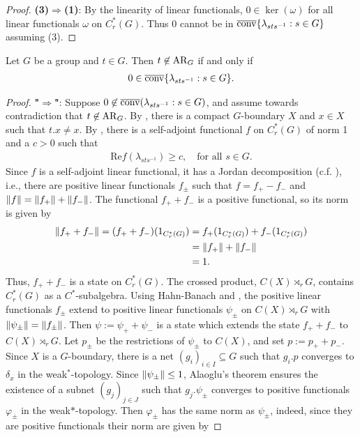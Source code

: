 \begin{lemma}
\begin{proof}
\noindent \textbf{(3)$\Rightarrow$(1)}: By the linearity of linear functionals, $0 \in \ker(\omega)$ for all linear functionals $\omega$ on $C_r^*(G)$. Thus $0$ cannot be in $\overline{\operatorname{conv}}\{ \lambda_{sts^{-1}} : s \in G \}$ assuming (3).
\end{proof}
\end{lemma}


\begin{theorem}\label{trivial AR_g 0 in conv}
Let $G$ be a group and $t \in G$. Then $t \not\in \operatorname{AR}_G$ if and only if 
\begin{align*}
0 \in \overline{\operatorname{conv}}\{\lambda_{sts^{-1}} : s \in G\}.
\end{align*}
\begin{proof}
\textbf{"$\Rightarrow$"}: Suppose $0 \not\in \overline{\operatorname{conv}}(\lambda_{sts^{-1}} : s \in G)$, and assume towards contradiction that $t \not \in \operatorname{AR}_G$. By , there is a compact $G$-boundary $X$ and $x \in X$ such that $t.x \neq x$. By , there is a self-adjoint functional $f$ on $C_r^*(G)$ of norm 1 and a $c > 0$ such that 
\begin{align*}
\mathrm{Re}f( \lambda_{sts^{-1}}) \geq c, \quad \text{for all } s \in G.
\end{align*}
Since $f$ is a self-adjoint linear functional, it has a Jordan decomposition (c.f. \cite[Theorem II.6.3.4][106]{blackadar}), i.e., there are positive linear functionals $f_{\pm}$ such that $f= f_+ - f_-$ and $\lVert f \rVert = \lVert f_+ \rVert + \lVert f_- \rVert$. The functional $f_+ + f_-$ is a positive functional, so its norm is given by
\begin{align*}
\lVert f_+ + f_- \rVert = (f_+ + f_-)(1_{C_r^*(G)})&=f_+(1_{C_r^*(G)})+f_-(1_{C_r^*(G)})\\&=\lVert f_+ \rVert + \lVert f_- \rVert \\&= 1.
\end{align*}
Thus, $f_+ + f_-$ is a state on $C_r^*(G)$. The crossed product, $C(X) \rtimes_r G$, contains $C_r^*(G)$ as a $C^*$-subalgebra. Using Hahn-Banach and \cite[Lemma 1.5.15][16]{brown2008c}, the positive linear functionals $f_{\pm}$ extend to positive linear functionals $\psi_{\pm}$ on $C(X) \rtimes_r G$ with $\lVert \psi_{\pm} \rVert = \lVert f_{\pm} \rVert$. Then $\psi:= \psi_+ + \psi_-$ is a state which extends the state $f_+ + f_-$ to $C(X) \rtimes_r G$. Let $p_{\pm}$ be the restrictions of $\psi_{\pm}$ to $C(X)$, and set $p:= p_+ + p_-$. Since $X$ is a $G$-boundary, there is a net $(g_i)_{i \in I} \subseteq G$ such that $g_i.p$ converges to $\delta_x$ in the weak$^*$-topology. Since $\lVert \psi_{\pm} \rVert \leq 1$, Alaoglu's theorem ensures the existence of a subnet $(g_j)_{j \in J}$ such that $g_j . \psi_{\pm}$ converges to positive functionals $\varphi_{\pm}$ in the weak$*$-topology. Then $\varphi_{\pm}$ has the same norm as $\psi_{\pm}$, indeed, since they are positive functionals their norm are given by

\end{proof}
\end{theorem}
